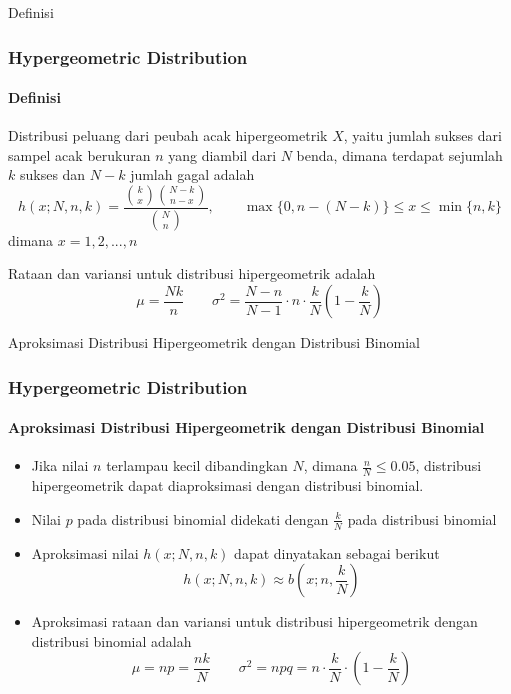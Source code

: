 \documentclass[]{beamer}
\begin{document}
\begin{frame}{Definisi}
    \frametitle{Hypergeometric Distribution}
    \framesubtitle{Definisi}
    Distribusi peluang dari peubah acak hipergeometrik $X$, yaitu jumlah sukses dari sampel acak berukuran $n$ yang diambil dari $N$ benda, dimana terdapat sejumlah $k$ sukses dan $N-k$ jumlah gagal adalah
    \begin{equation*}
        h(x;N,n,k) = \frac{\binom{k}{x}\binom{N-k}{n-x}}{\binom{N}{n}}, \qquad \max\{0, n - (N - k)\} \le x \le \min\{n, k\}
    \end{equation*}
    dimana $x=1,2,...,n$
    
    \bigskip
    
    Rataan dan variansi untuk distribusi hipergeometrik adalah
    \begin{equation*}
        \mu = \frac{Nk}{n} \qquad \sigma^2 = \frac{N-n}{N-1}\cdot n\cdot \frac{k}{N}(1-\frac{k}{N})
    \end{equation*}
\end{frame}

\begin{frame}{Aproksimasi Distribusi Hipergeometrik dengan Distribusi Binomial}
    \frametitle{Hypergeometric Distribution}
    \framesubtitle{Aproksimasi Distribusi Hipergeometrik dengan Distribusi Binomial}
    \begin{itemize}
        \item Jika nilai $n$ terlampau kecil dibandingkan $N$, dimana $\frac{n}{N}\le0.05$, distribusi hipergeometrik dapat diaproksimasi dengan distribusi binomial.
        \item Nilai $p$ pada distribusi binomial didekati dengan $\frac{k}{N}$ pada distribusi binomial
        \item Aproksimasi nilai $h(x;N,n,k)$ dapat dinyatakan sebagai berikut
            \begin{equation*}
            h(x;N,n,k) \approx b(x;n,\frac{k}{N})
            \end{equation*}
        \item Aproksimasi rataan dan variansi untuk distribusi hipergeometrik dengan distribusi binomial adalah 
            \begin{equation*}
                \mu = np = \frac{nk}{N} \qquad \sigma^2 = npq = n \cdot \frac{k}{N} \cdot(1-\frac{k}{N})
            \end{equation*}
    \end{itemize}
\end{frame}
\end{document}
